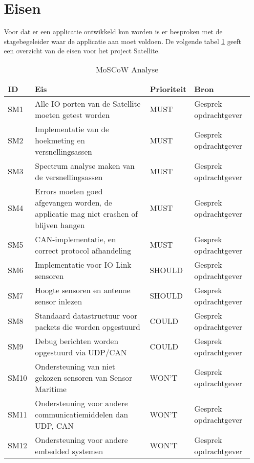 \section{Eisen}
Voor dat er een applicatie ontwikkeld kon worden is er besproken met de stagebegeleider waar de applicatie aan moet voldoen. De volgende tabel \ref{tab:eisen} geeft een overzicht van de eisen voor het project Satellite.
\begin{table}[h!]
	\centering
	\caption{MoSCoW Analyse}
	\label{tab:eisen}
	\begin{tabular}{lp{9cm}ll}
	\toprule
	\textbf{ID} & \textbf{Eis} & \textbf{Prioriteit} & \textbf{Bron} \\ \midrule
	SM1			& Alle IO porten van de Satellite moeten getest worden 										& MUST		& Gesprek opdrachtgever \\
	SM2			& Implementatie van de hoekmeting en versnellingsassen 										& MUST		& Gesprek opdrachtgever \\ 
	SM3			& Spectrum analyse maken van de versnellingsassen 											& MUST		& Gesprek opdrachtgever \\ 
	SM4			& Errors moeten goed afgevangen worden, de applicatie mag niet crashen of blijven hangen 	& MUST		& Gesprek opdrachtgever \\ 
	SM5			& CAN-implementatie, en correct protocol afhandeling										& MUST		& Gesprek opdrachtgever \\ \midrule
	SM6			& Implementatie voor IO-Link sensoren 														& SHOULD	& Gesprek opdrachtgever \\
	SM7			& Hoogte sensoren en antenne sensor inlezen 												& SHOULD	& Gesprek opdrachtgever \\  \midrule
	SM8			& Standaard datastructuur voor packets die worden opgestuurd								& COULD		& Gesprek opdrachtgever \\
	SM9			& Debug berichten worden opgestuurd via UDP/CAN 											& COULD		& Gesprek opdrachtgever \\  \midrule
	SM10		& Ondersteuning van niet gekozen sensoren van Sensor Maritime 								& WON'T		& Gesprek opdrachtgever \\
	SM11		& Ondersteuning voor andere communicatiemiddelen dan UDP, CAN 								& WON'T		& Gesprek opdrachtgever \\
	SM12		& Ondersteuning voor andere embedded systemen  												& WON'T		& Gesprek opdrachtgever \\\bottomrule
	\end{tabular}
\end{table}
